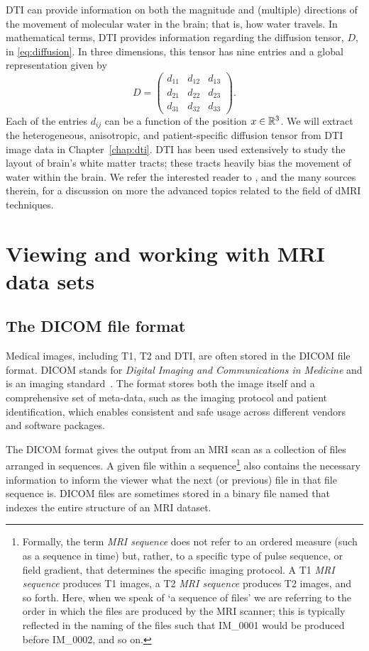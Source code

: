 DTI can provide information on both the magnitude and (multiple) directions 
of the movement of molecular water in the brain; that is, how water travels.  
In mathematical terms, DTI provides information regarding the diffusion 
tensor, $D$, in \eqref{eq:diffusion}.  In three dimensions, this tensor has 
nine entries and a global representation given by
\begin{equation}
D = \begin{pmatrix}
  d_{11} & d_{12} & d_{13} \\
  d_{21} & d_{22} & d_{23} \\
  d_{31} & d_{32} & d_{33}
\end{pmatrix}.
\end{equation}
Each of the entries $d_{ij}$ can be a function of the position $x \in
\mathbb{R}^3$. We will extract the heterogeneous, anisotropic,
and patient-specific diffusion tensor from DTI 
image data in Chapter~\ref{chap:dti}.  DTI has been used extensively to 
study the layout of brain's white matter tracts; these tracts heavily bias 
the movement of water within the brain. We refer the interested reader to
\cite{jeurissen2017}, and the many sources therein, for a discussion
on more the advanced topics related to the field of dMRI techniques.

\section{Viewing and working with MRI data sets}
\label{sec:chp2:tools:viewers}

\subsection{The DICOM file format}

Medical images, including T1, T2 and DTI, are often stored in the
DICOM file format. DICOM stands for \emph{Digital Imaging and
  Communications in Medicine} and is an imaging
standard~\cite{mildenberger2002introduction}. The format stores both
the image itself and a comprehensive set of meta-data, such as
the imaging protocol and patient identification, which enables
consistent and safe usage across different vendors and software
packages.  

The DICOM format gives the output from an MRI scan as a collection of
files arranged in sequences. A given file within a sequence\footnote{Formally, 
the term \textit{MRI sequence} does not refer to an ordered measure (such as a 
sequence in time) but, rather, to a specific type of pulse sequence, or field 
gradient, that determines the specific imaging protocol.  A T1 
\textit{MRI sequence} produces T1 images, a T2 \textit{MRI sequence} produces 
T2 images, and so forth.  Here, when we speak of `a sequence of files' we are 
referring to the order in which the files are produced by the MRI scanner; this 
is typically reflected in the naming of the files such that IM\_0001 would be 
produced before IM\_0002, and so on.} also contains the necessary information 
to inform the viewer what the next (or previous) file in that file sequence is. 
DICOM files are sometimes stored in a binary file named  that 
indexes the entire structure of an MRI dataset. 

